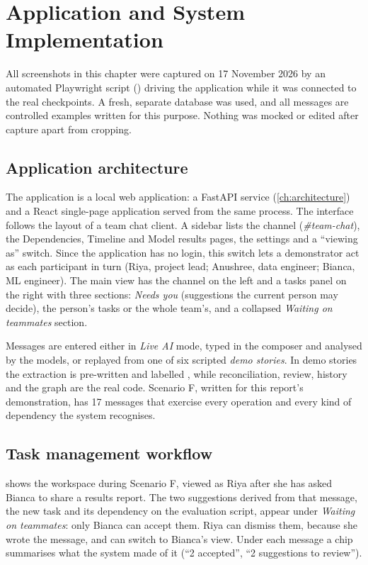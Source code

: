 \chapter{Application and System Implementation}
\label{ch:application}

All screenshots in this chapter were captured on 17 November 2026 by an automated Playwright script () driving the application while it was connected to the real checkpoints. A fresh, separate database was used, and all messages are controlled examples written for this purpose. Nothing was mocked or edited after capture apart from cropping.

\section{Application architecture}
The application is a local web application: a FastAPI service (\cref{ch:architecture}) and a React single-page application served from the same process. The interface follows the layout of a team chat client. A sidebar lists the channel (\emph{\#team-chat}), the Dependencies, Timeline and Model results pages, the settings and a ``viewing as'' switch. Since the application has no login, this switch lets a demonstrator act as each participant in turn (Riya, project lead; Anushree, data engineer; Bianca, ML engineer). The main view has the channel on the left and a tasks panel on the right with three sections: \emph{Needs you} (suggestions the current person may decide), the person's tasks or the whole team's, and a collapsed \emph{Waiting on teammates} section.

Messages are entered either in \emph{Live AI} mode, typed in the composer and analysed by the models, or replayed from one of six scripted \emph{demo stories}. In demo stories the extraction is pre-written and labelled , while reconciliation, review, history and the graph are the real code. Scenario F, written for this report's demonstration, has 17 messages that exercise every operation and every kind of dependency the system recognises.

\section{Task management workflow}
 shows the workspace during Scenario F, viewed as Riya after she has asked Bianca to share a results report. The two suggestions derived from that message, the new task and its dependency on the evaluation script, appear under \emph{Waiting on teammates}: only Bianca can accept them. Riya can dismiss them, because she wrote the message, and can switch to Bianca's view. Under each message a chip summarises what the system made of it (``2 accepted'', ``2 suggestions to review'').

